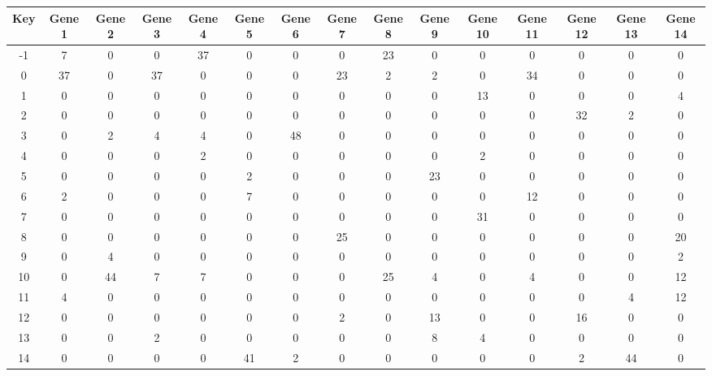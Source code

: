 \begin{tabular}{|c|c|c|c|c|c|c|c|c|c|c|c|c|c|c|}
\hline
Key & Gene 1 & Gene 2 & Gene 3 & Gene 4 & Gene 5 & Gene 6 & Gene 7 & Gene 8 & Gene 9 & Gene 10 & Gene 11 & Gene 12 & Gene 13 & Gene 14 \\
\hline
-1 & 7 & 0 & 0 & 37 & 0 & 0 & 0 & 23 & 0 & 0 & 0 & 0 & 0 & 0 \\
0 & 37 & 0 & 37 & 0 & 0 & 0 & 23 & 2 & 2 & 0 & 34 & 0 & 0 & 0 \\
1 & 0 & 0 & 0 & 0 & 0 & 0 & 0 & 0 & 0 & 13 & 0 & 0 & 0 & 4 \\
2 & 0 & 0 & 0 & 0 & 0 & 0 & 0 & 0 & 0 & 0 & 0 & 32 & 2 & 0 \\
3 & 0 & 2 & 4 & 4 & 0 & 48 & 0 & 0 & 0 & 0 & 0 & 0 & 0 & 0 \\
4 & 0 & 0 & 0 & 2 & 0 & 0 & 0 & 0 & 0 & 2 & 0 & 0 & 0 & 0 \\
5 & 0 & 0 & 0 & 0 & 2 & 0 & 0 & 0 & 23 & 0 & 0 & 0 & 0 & 0 \\
6 & 2 & 0 & 0 & 0 & 7 & 0 & 0 & 0 & 0 & 0 & 12 & 0 & 0 & 0 \\
7 & 0 & 0 & 0 & 0 & 0 & 0 & 0 & 0 & 0 & 31 & 0 & 0 & 0 & 0 \\
8 & 0 & 0 & 0 & 0 & 0 & 0 & 25 & 0 & 0 & 0 & 0 & 0 & 0 & 20 \\
9 & 0 & 4 & 0 & 0 & 0 & 0 & 0 & 0 & 0 & 0 & 0 & 0 & 0 & 2 \\
10 & 0 & 44 & 7 & 7 & 0 & 0 & 0 & 25 & 4 & 0 & 4 & 0 & 0 & 12 \\
11 & 4 & 0 & 0 & 0 & 0 & 0 & 0 & 0 & 0 & 0 & 0 & 0 & 4 & 12 \\
12 & 0 & 0 & 0 & 0 & 0 & 0 & 2 & 0 & 13 & 0 & 0 & 16 & 0 & 0 \\
13 & 0 & 0 & 2 & 0 & 0 & 0 & 0 & 0 & 8 & 4 & 0 & 0 & 0 & 0 \\
14 & 0 & 0 & 0 & 0 & 41 & 2 & 0 & 0 & 0 & 0 & 0 & 2 & 44 & 0 \\
\hline
\end{tabular}